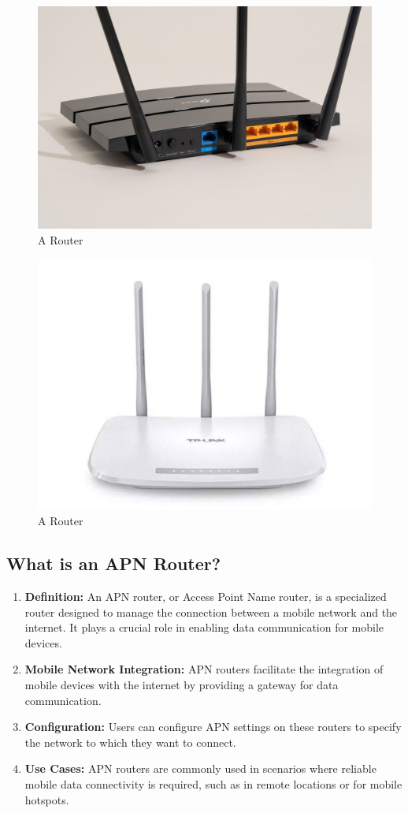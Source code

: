 \documentclass[11pt]{article}
\begin{document}
\begin{figure}[H]
  \centering
  \includegraphics[width=.45\textwidth]{routers/routers_0.jpg}
  \caption{A Router}
\end{figure}

\begin{figure}[H]
  \centering
  \includegraphics[width=.45\textwidth]{routers/routers_7.jpg}
  \caption{A Router}
\end{figure}

\subsection{What is an APN Router?}
\begin{enumerate}
  \item \textbf{Definition:} An APN router, or Access Point Name router, is a specialized router designed to manage the connection between a mobile network and the internet. It plays a crucial role in enabling data communication for mobile devices.

  \item \textbf{Mobile Network Integration:} APN routers facilitate the integration of mobile devices with the internet by providing a gateway for data communication.

  \item \textbf{Configuration:} Users can configure APN settings on these routers to specify the network to which they want to connect.

  \item \textbf{Use Cases:} APN routers are commonly used in scenarios where reliable mobile data connectivity is required, such as in remote locations or for mobile hotspots.
\end{enumerate}
\end{document}
